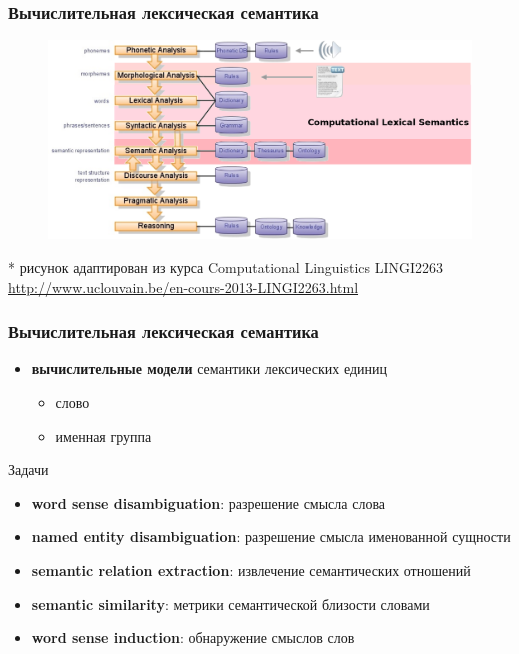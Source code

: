 \begin{frame}
\frametitle{Вычислительная лексическая семантика}

\begin{figure}
\centering
\includegraphics[width=1.05\textwidth]{./figures/levels}
\end{figure}

 \tiny{* рисунок адаптирован из курса Computational Linguistics LINGI2263 \url{http://www.uclouvain.be/en-cours-2013-LINGI2263.html}}

\end{frame}


\begin{frame}
\frametitle{Вычислительная лексическая семантика}

\begin{itemize}
  \item \textbf{вычислительные модели} семантики лексических единиц 
  \begin{itemize}
    \item слово
    \item именная группа
  \end{itemize}
\end{itemize}

\begin{block}{Задачи}
\begin{itemize}
  \item \textbf{word sense disambiguation}: разрешение смысла слова
  \item \textbf{named entity disambiguation}: разрешение смысла именованной сущности
  \item \textbf{semantic relation extraction}: извлечение семантических отношений 
  \item \textbf{semantic similarity}: метрики семантической близости словами 
  \item \textbf{word sense induction}: обнаружение смыслов слов 
\end{itemize}
\end{block}
\end{frame}



